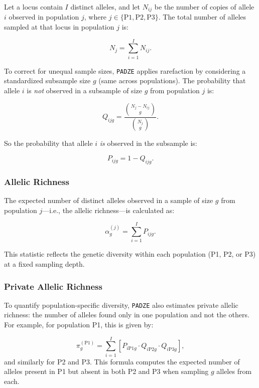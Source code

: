 \documentclass[11pt]{article}
\theoremstyle{plain}
\theoremstyle{definition}
\theoremstyle{remark}
\begin{document}
Let a locus contain $I$ distinct alleles, and let $N_{ij}$ be the number of copies of allele $i$ observed in population $j$, where $j \in \{\text{P1}, \text{P2}, \text{P3}\}$. The total number of alleles sampled at that locus in population $j$ is:

\[
N_j = \sum_{i=1}^I N_{ij}.
\]

To correct for unequal sample sizes, \texttt{PADZE} applies rarefaction by considering a standardized subsample size $g$ (same across populations). The probability that allele $i$ is \textit{not} observed in a subsample of size $g$ from population $j$ is:

\begin{equation}
Q_{ijg} = \frac{\binom{N_j - N_{ij}}{g}}{\binom{N_j}{g}}.
\end{equation}

So the probability that allele $i$ \textit{is} observed in the subsample is:

\[
P_{ijg} = 1 - Q_{ijg}.
\]

\subsubsection{Allelic Richness}

The expected number of distinct alleles observed in a sample of size $g$ from population $j$—i.e., the allelic richness—is calculated as:

\begin{equation}
{\alpha}^{(j)}_g = \sum_{i=1}^I P_{ijg}.
\end{equation}

This statistic reflects the genetic diversity within each population (P1, P2, or P3) at a fixed sampling depth.

\subsubsection{Private Allelic Richness}

To quantify population-specific diversity, \texttt{PADZE} also estimates private allelic richness: the number of alleles found only in one population and not the others. For example, for population P1, this is given by:

\begin{equation}
{\pi}^{(\text{P1})}_g = \sum_{i=1}^{I} \left[ P_{i\text{P1}g} \cdot Q_{i\text{P2}g} \cdot Q_{i\text{P3}g} \right],
\end{equation}
and similarly for P2 and P3. This formula computes the expected number of alleles present in P1 but absent in both P2 and P3 when sampling $g$ alleles from each.
\end{document}
